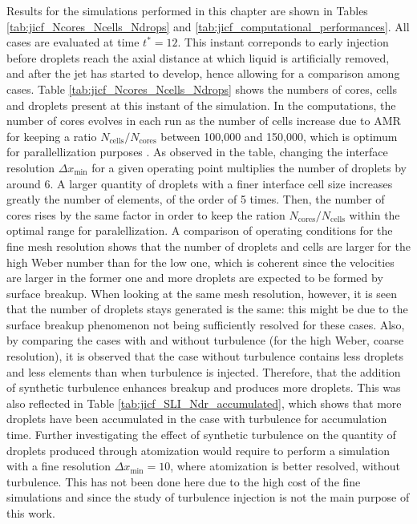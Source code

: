Results for the simulations performed in this chapter are shown in Tables \ref{tab:jicf_Ncores_Ncells_Ndrops} and \ref{tab:jicf_computational_performances}. All cases are evaluated at time $t^* = 12$. This instant correponds to early injection before droplets reach the axial distance at which liquid is artificially removed, and after the jet has started to develop, hence allowing for a comparison among cases. Table \ref{tab:jicf_Ncores_Ncells_Ndrops} shows the numbers of cores, cells and droplets present at this instant of the simulation. In the computations, the number of cores evolves in each run as the number of cells increase due to AMR for keeping a ratio $N_\mathrm{cells} / N_\mathrm{cores}$ between 100,000 and 150,000, which is optimum for parallellization purposes . As observed in the table, changing the interface resolution $\Delta x_\mathrm{min}$ for a given operating point multiplies the number of droplets by around 6. A larger quantity of droplets with a finer interface cell size increases greatly the number of elements, of the order of 5 times. Then, the number of cores rises by the same factor in order to keep the ration $N_\mathrm{cores}/N_\mathrm{cells}$ within the optimal range for paralellization. A comparison of operating conditions for the fine mesh resolution shows that the number of droplets and cells are larger for the high Weber number than for the low one, which is coherent since the velocities are larger in the former one and more droplets are expected to be formed by surface breakup. When looking at the same mesh resolution, however, it is seen that the number of droplets stays generated is the same: this might be due to the surface breakup phenomenon not being sufficiently resolved for these cases. Also, by comparing the cases with and without turbulence (for the high Weber, coarse resolution), it is observed that the case without turbulence contains less droplets and less elements than when turbulence is injected. Therefore, that the addition of synthetic turbulence enhances breakup and produces more droplets. This was also reflected in Table \ref{tab:jicf_SLI_Ndr_accumulated}, which shows that more droplets have been accumulated in the case with turbulence for accumulation time. Further investigating the effect of synthetic turbulence on the quantity of droplets produced through atomization would require to perform a simulation with a fine resolution $\Delta x_\mathrm{min} = 10$, where atomization is better resolved, without turbulence. This has not been done here due to the high cost of the fine simulations and since the study of turbulence injection is not the main purpose of this work.

